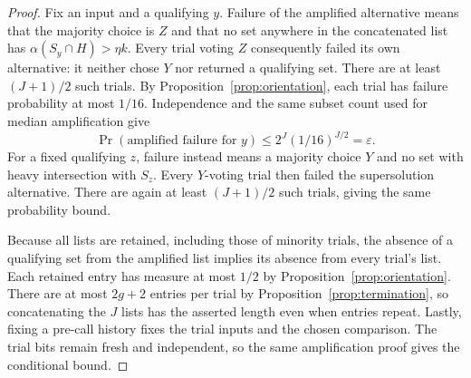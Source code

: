 \begin{proof}
Fix an input and a qualifying \(y\). Failure of the amplified
alternative means that the majority choice is \(Z\) and that no
set anywhere in the concatenated list has
\(\alpha(S_y\cap H)>\eta k\).
Every trial voting \(Z\) consequently failed its own alternative:
it neither chose \(Y\) nor returned a qualifying set. There are at
least \((J+1)/2\) such trials. By
Proposition~\ref{prop:orientation}, each trial has failure probability
at most \(1/16\). Independence and the same subset count used for
median amplification give
\[
  \Pr(\text{amplified failure for }y)
  \leq 2^J(1/16)^{J/2}
  =\varepsilon.
\]
For a fixed qualifying \(z\), failure instead means a majority
choice \(Y\) and no set with heavy intersection with \(S_z\).
Every \(Y\)-voting trial then failed the supersolution alternative.
There are again at least \((J+1)/2\) such trials, giving the same
probability bound.

Because all lists are retained, including those of minority trials,
the absence of a qualifying set from the amplified list implies its
absence from every trial's list. Each retained entry has measure at
most \(1/2\) by Proposition~\ref{prop:orientation}. There are at
most \(2g+2\) entries per trial by
Proposition~\ref{prop:termination}, so concatenating the \(J\) lists
has the asserted length even when entries repeat.
Lastly, fixing a pre-call history fixes the trial inputs and the
chosen comparison. The trial bits remain fresh and independent,
so the same amplification proof gives the conditional bound.
\end{proof}
